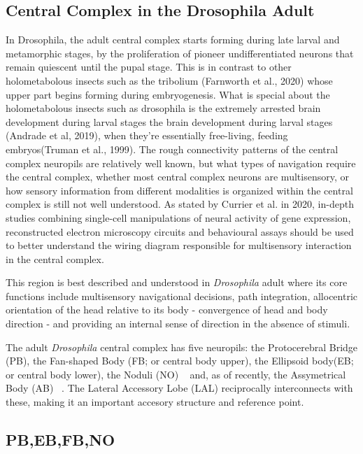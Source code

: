     \subsection{Central Complex in the Drosophila Adult}
        In Drosophila,  the adult central complex starts forming during late larval and metamorphic stages, by the proliferation of pioneer undifferentiated neurons that remain quiescent until the pupal stage. This is in contrast to other holometabolous insects such as the tribolium (Farnworth et al., 2020) whose upper part begins forming during embryogenesis. 
        What is special about the holometabolous insects such as drosophila is the extremely arrested brain development during larval stages the brain development during larval stages (Andrade et al, 2019), when they’re essentially free-living, feeding embryos(Truman et al., 1999).    
        The rough connectivity patterns of the central complex neuropils are relatively well known, but what types of navigation require the central complex, whether most central complex neurons are multisensory, or how sensory information from different modalities is organized within the central complex is still not well understood. As stated by Currier et al. in 2020, in-depth studies combining single-cell manipulations of neural activity of gene expression, reconstructed electron microscopy circuits and behavioural assays should be used to better understand the wiring diagram responsible for multisensory interaction in the central complex.

        This region is best described %
        and understood %
        in \textit{Drosophila} adult where its core functions include multisensory navigational decisions, path integration, allocentric orientation of the head relative to its body - convergence of head and body direction - and providing an internal sense of direction in the absence of stimuli. %

        The adult \textit{\textit{Drosophila}} central complex has five neuropils: the Protocerebral Bridge (PB), the Fan-shaped Body (FB; or central body upper), the Ellipsoid body(EB; or central body lower), the Noduli (NO) ~\citep{hanesch1989neuronal} and, as of recently, the Assymetrical Body (AB) ~\citep{wolff2018neuroarchitecture}. The Lateral Accessory Lobe (LAL) reciprocally interconnects with these, making it an important accesory structure and reference point. 
    
    \subsection{PB,EB,FB,NO}
    

